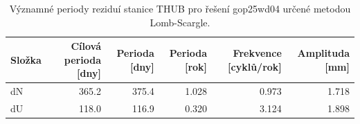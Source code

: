 \begin{table}[htbp]
\caption{Významné periody reziduí stanice THUB pro řešení gop25wd04 určené metodou Lomb-Scargle.}
\label{tab:gop25wd04_stcd_thub_detr_weighted_1seg_spectral_lomb_scargle_significant_periods}
\begin{tabular}{lrrrrr}
\toprule
Složka & Cílová perioda [dny] & Perioda [dny] & Perioda [rok] & Frekvence [cyklů/rok] & Amplituda [mm] \\
\midrule
dN & 365.2 & 375.4 & 1.028 & 0.973 & 1.718 \\
dU & 118.0 & 116.9 & 0.320 & 3.124 & 1.898 \\
\bottomrule
\end{tabular}
\end{table}
